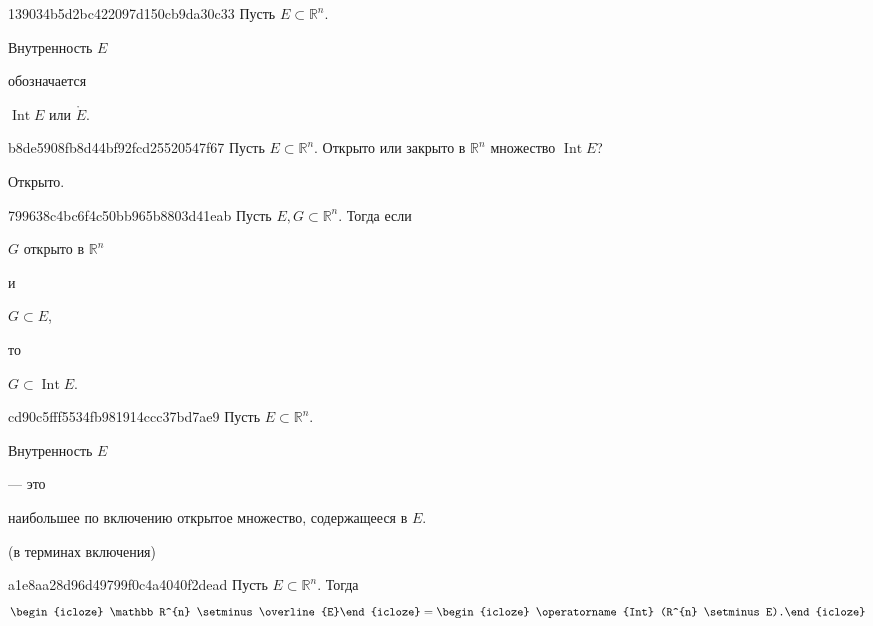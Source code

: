 \begin{note}{139034b5d2bc422097d150cb9da30c33}
    Пусть \({ E \subset \mathbb R^{n} }\).
    \begin{icloze}{2}Внутренность \({ E }\)\end{icloze} обозначается
    \begin{icloze}{1}
        \begin{center}
            \({ \operatorname{Int} E }\) или \({ \mathring{E} }\).
        \end{center}
    \end{icloze}
\end{note}

\begin{note}{b8de5908fb8d44bf92fcd25520547f67}
    Пусть \({ E \subset \mathbb R^{n} }\).
    Открыто или закрыто в \({ \mathbb R^{n} }\) множество \({ \operatorname{Int} E }\)?

    \begin{cloze}{1}
        Открыто.
    \end{cloze}
\end{note}

\begin{note}{799638c4bc6f4c50bb965b8803d41eab}
    Пусть \({ E, G \subset \mathbb R^{n} }\).
    Тогда если \begin{icloze}{3}\({ G }\) открыто в \({ \mathbb R^{n} }\)\end{icloze} и \begin{icloze}{2}\({ G \subset E }\),\end{icloze} то \begin{icloze}{1}\({ G \subset \operatorname{Int} E }\).\end{icloze}
\end{note}

\begin{note}{cd90c5fff5534fb981914ccc37bd7ae9}
    Пусть \({ E \subset \mathbb R^{n} }\).
    \begin{icloze}{2}Внутренность \({ E }\)\end{icloze} --- это \begin{icloze}{1}наибольшее по включению открытое множество, содержащееся в \({ E }\).\end{icloze}

    \begin{center}
        \tiny (в терминах включения)
    \end{center}
\end{note}

\begin{note}{a1e8aa28d96d49799f0c4a4040f2dead}
    Пусть \({ E \subset \mathbb R^{n} }\).
    Тогда
    \[
        \begin{icloze}{2}\mathbb R^{n} \setminus \overline{E}\end{icloze} = \begin{icloze}{1}\operatorname{Int} (R^{n} \setminus E).\end{icloze}
    \]
\end{note}

